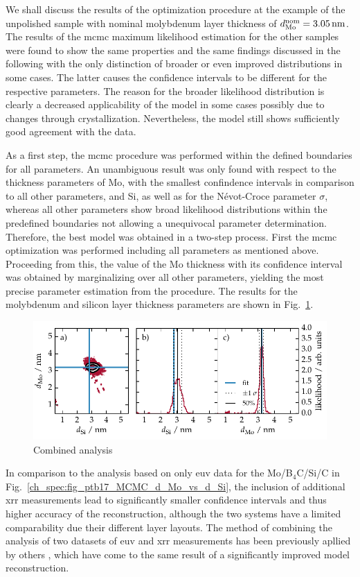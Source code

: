 We shall discuss the results of the optimization procedure at the example of the unpolished sample with nominal molybdenum layer thickness of $d_\text{Mo}^\text{nom} = \nm{3.05}$. The results of the \gls{mcmc} maximum likelihood estimation for the other samples were found to show the same properties and the same findings discussed in the following with the only distinction of broader or even improved distributions in some cases. The latter causes the confidence intervals to be different for the respective parameters. The reason for the broader likelihood distribution is clearly a decreased applicability of the model in some cases possibly due to changes through crystallization. Nevertheless, the model still shows sufficiently good agreement with the data.

As a first step, the \gls{mcmc} procedure was performed within the defined boundaries for all parameters. An unambiguous result was only found with respect to the thickness parameters of Mo, with the smallest confindence intervals in comparison to all other parameters, and Si, as well as for the N\'{e}vot-Croce parameter $\sigma$, whereas all other parameters show broad likelihood distributions within the predefined boundaries not allowing a unequivocal parameter determination. Therefore, the best model was obtained in a two-step process. First the \gls{mcmc} optimization was performed including all parameters as mentioned above. Proceeding from this, the value of the Mo thickness with its confidence interval was obtained by marginalizing over all other parameters, yielding the most precise parameter estimation from the procedure. The results for the molybdenum and silicon layer thickness parameters are shown in Fig.~\ref{ch_spec:fig_Mo_Si_C_d_Mo_vs_d_Si}.
\begin{figure}[htbp]
\centering
\includegraphics{img/Mo_Si_C_d_Mo_vs_d_Si}
\caption{Combined analysis}
\label{ch_spec:fig_Mo_Si_C_d_Mo_vs_d_Si}
\end{figure}
In comparison to the analysis based on only \gls{euv} data for the Mo/B$_4$C/Si/C in Fig.~\ref{ch_spec:fig_ptb17_MCMC_d_Mo_vs_d_Si}, the inclusion of additional \gls{xrr} measurements lead to significantly smaller confidence intervals and thus higher accuracy of the reconstruction, although the two systems have a limited comparability due their different layer layouts. The method of combining the analysis of two datasets of \gls{euv} and \gls{xrr} measurements has been previously apllied by others \cite{yakunin_combined_2014}, which have come to the same result of a significantly improved model reconstruction.

